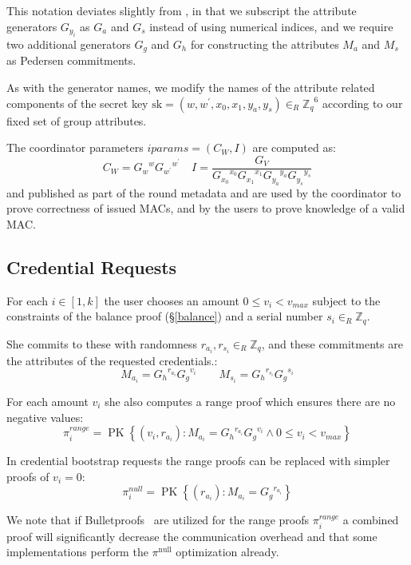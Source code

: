 \documentclass{article}
\begin{document}
This notation deviates slightly from \cite{chase2019signal}, in that we subscript the attribute generators $G_{y_i}$ as $G_a$ and $G_s$ instead of using numerical indices, and we require two additional generators $G_g$ and $G_h$ for constructing the attributes $M_a$ and $M_s$ as Pedersen commitments.

As with the generator names, we modify the names of the attribute related components of the secret key
$\mathrm{sk} = (w, w^{\prime}, x_{0}, x_{1}, y_{a}, y_{s}) \in_R {\mathbb{Z}_q}^6$
according to our fixed set of group attributes.

The coordinator parameters
$\mathit{iparams} =  (C_{W}, I)$
are computed as:
\[
C_{W}={G_w}^{w} {G_{w^\prime}}^{w^\prime}
\quad
I=\frac{G_{V}}{{G_{x_0}}^{x_0} {G_{x_1}}^{x_1} {G_{y_a}}^{y_a} {G_{y_s}}^{y_s}}
\]
and published as part of the round metadata and are used by the coordinator to prove correctness of issued MACs, and by the users to prove knowledge of a valid MAC.

\subsection{Credential Requests}

For each $i \in [1, k]$ the user chooses an amount $0 \leq v_i < v_{\mathit{max}}$ subject to the constraints of the balance proof (\S\ref{balance}) and a serial number $s_i \in_R \mathbb{Z}_q$.

She commits to these with randomness $r_{a_i}, r_{s_i} \in_R \mathbb{Z}_q$, and these commitments are the attributes of the requested credentials.:
\[ M_{a_i}={G_h}^{r_{a_i}}{G_g}^{v_i} \qquad M_{s_i}={G_h}^{r_{s_i}}{G_g}^{s_i} \]

For each amount $v_i$ she also computes a range proof which ensures there are no negative values:
\[
\pi^{\mathit{range}}_i = \operatorname{PK}\left\{\left(v_i, r_{a_i} \right) :
M_{a_i} = {G_h}^{r_{a_i}}{G_g}^{v_i}
\land
0 \leq v_i < v_{\mathit{max}} \right\}
\]

In credential bootstrap requests the range proofs can be replaced with simpler proofs of $v_i = 0$:
\[
  \pi^{\mathit{null}}_i = \operatorname{PK}\left\{ \left( r_{a_i}\right) :
    M_{a_i} = {G_{g}}^{r_{a_i}}
  \right\}
\]

We note that if Bulletproofs~\cite{bunz2018bulletproofs} are utilized for the range proofs $\pi^{\textit{range}}_i$ a combined proof will significantly decrease the communication overhead and that some implementations perform the $\pi^{\mathrm{null}}$ optimization already.
\end{document}
